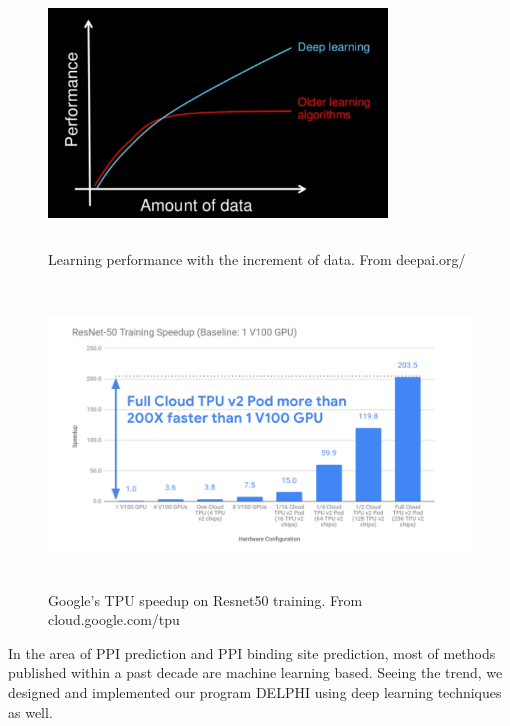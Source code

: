 \begin{figure}[!h]
\begin{center}
\includegraphics[height = 7cm, width = 9cm]{img/data_deeplearning.png}
\caption[Learning performance with the increment of data]{Learning performance with the increment of data. From deepai.org/  \label{fig_data_performance}}
\end{center}
\end{figure}

\begin{figure}[h!]
\begin{center}
\includegraphics[height = 8cm, width = 13cm]{img/hardware_speedup.png}
\caption[Google's TPU speedup on Resnet50 training]{Google's TPU speedup on Resnet50 training. From cloud.google.com/tpu \label{fig_hardware_speedup}}
\end{center}
\end{figure}

In the area of PPI prediction and PPI binding site prediction, most of methods published within a past decade are machine learning based. Seeing the trend, we designed and implemented our program DELPHI using deep learning techniques as well.

